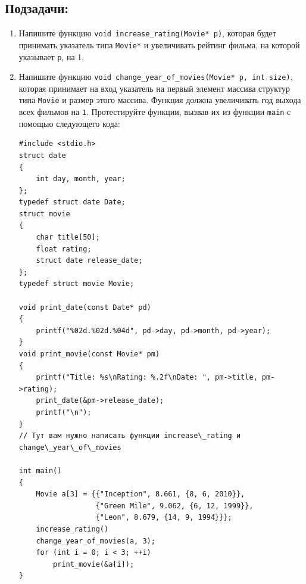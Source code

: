 \documentclass[10pt]{article}
\begin{document}
\subsection*{Подзадачи:}
\begin{enumerate}

\item Напишите функцию \texttt{void increase\_rating(Movie* p)}, которая будет принимать указатель типа \texttt{Movie*} и увеличивать рейтинг фильма, на которой указывает \texttt{p}, на 1.

\item Напишите функцию \texttt{void change\_year\_of\_movies(Movie* p, int size)}, которая принимает на вход указатель на первый элемент массива структур типа \texttt{Movie} и размер этого массива. Функция должна увеличивать год выхода всех фильмов на \texttt{1}. Протестируйте функции, вызвав их из функции \texttt{main} с помощью следующего кода:

\begin{lstlisting}
#include <stdio.h>
struct date 
{
    int day, month, year;
};
typedef struct date Date;
struct movie 
{
    char title[50];
    float rating;
    struct date release_date;
};
typedef struct movie Movie;

void print_date(const Date* pd) 
{
    printf("%02d.%02d.%04d", pd->day, pd->month, pd->year);
}
void print_movie(const Movie* pm) 
{
    printf("Title: %s\nRating: %.2f\nDate: ", pm->title, pm->rating);
    print_date(&pm->release_date);
    printf("\n");
}
// Тут вам нужно написать функции increase\_rating и change\_year\_of\_movies

int main() 
{
    Movie a[3] = {{"Inception", 8.661, {8, 6, 2010}}, 
                  {"Green Mile", 9.062, {6, 12, 1999}}, 
                  {"Leon", 8.679, {14, 9, 1994}}};
    increase_rating()
    change_year_of_movies(a, 3);
    for (int i = 0; i < 3; ++i)
        print_movie(&a[i]);
}
\end{lstlisting}

\end{enumerate}
\end{document}
